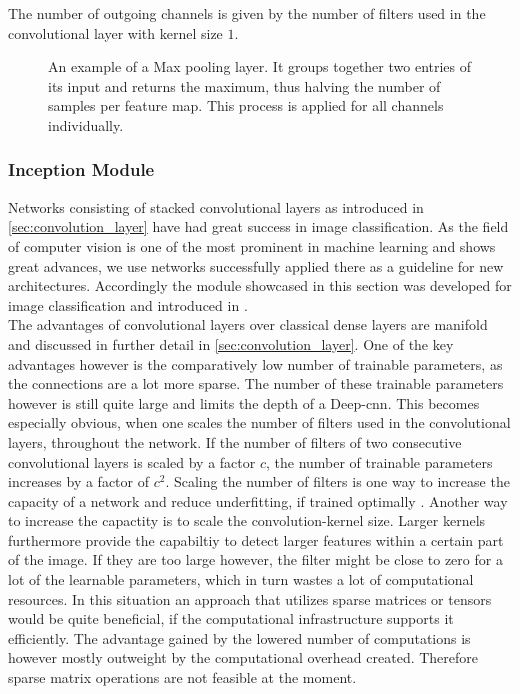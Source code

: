 The number of outgoing channels is given by the number of filters used in the convolutional layer with kernel size $1$.
\begin{figure}
\centering

\caption[Max Pooling layer]{An example of a Max pooling layer. It groups together two entries of its input and returns the maximum, thus halving the number of samples per feature map. This process is applied for all channels individually.}\label{fig:max_pooling}
\end{figure}

\subsubsection{Inception Module}\label{sec:inception_module}
Networks consisting of stacked convolutional layers as introduced in \autoref{sec:convolution_layer} have had great success in image classification. \cite{deep_learning_book, alex_net, ILSVRC15} As the field of computer vision is one of the most prominent in machine learning and shows great advances, we use networks successfully applied there as a guideline for new architectures. Accordingly the module showcased in this section was developed for image classification and introduced in \cite{inception_module}.\\
The advantages of convolutional layers over classical dense layers are manifold and discussed in further detail in \autoref{sec:convolution_layer}. One of the key advantages however is the comparatively low number of trainable parameters, as the connections are a lot more sparse. The number of these trainable parameters however is still quite large and limits the depth of a Deep-\gls{cnn}. This becomes especially obvious, when one scales the number of filters used in the convolutional layers, throughout the network. If the number of filters of two consecutive convolutional layers is scaled by a factor $c$, the number of trainable parameters increases by a factor of $c^2$. Scaling the number of filters is one way to increase the capacity of a network and reduce underfitting, if trained optimally \cite{inception_module}. Another way to increase the capactity is to scale the convolution-kernel size. Larger kernels furthermore provide the capabiltiy to detect larger features within a certain part of the image. If they are too large however, the filter might be close to zero for a lot of the learnable parameters, which in turn wastes a lot of computational resources. In this situation an approach that utilizes sparse matrices or tensors would be quite beneficial, if the computational infrastructure supports it efficiently. The advantage gained by the lowered number of computations is however mostly outweight by the computational overhead created. Therefore sparse matrix operations are not feasible at the moment. \cite{inception_module}\\
